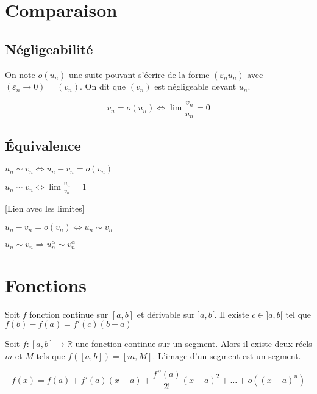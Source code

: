 \documentclass[french]{yLectureNote}
\begin{document}
\section{Comparaison}
\subsection{Négligeabilité}
\begin{definition}
On note $o(u_n)$ une suite pouvant s'écrire de la forme $(\varepsilon_nu_n)$ avec $(\varepsilon_n \to 0) = (v_n)$. On dit que $(v_n)$ est négligeable devant $u_n$.
\end{definition}
\begin{proposition}
\[v_n = o(u_n) \iff \lim \frac{v_n}{u_n} = 0\]
\end{proposition}
\subsection{Équivalence}
\begin{definition}
$u_n\sim v_n \iff u_n-v_n = o(v_n)$
\end{definition}
\begin{proposition}
$u_n\sim v_n \iff \lim \frac{u_n}{v_n} = 1$
\end{proposition}[Lien avec les limites]
\begin{proposition}
$u_n-v_n = o(v_n) \iff u_n\sim v_n$
\end{proposition}
\begin{proposition}
$u_n\sim v_n \Rightarrow u_n^{\alpha} \sim v_n^{\alpha}$
\end{proposition}
\section{Fonctions}
\begin{theorem}
Soit $f$ fonction continue sur $[a,b]$ et dérivable sur $]a,b[$. Il existe $c\in]a,b[$ tel que \(f(b)-f(a) = f'(c)(b-a)\)
\end{theorem}
\begin{theorem}
Soit $f : [a,b] \to \mathbb{R}$ une fonction continue sur un segment. Alors il existe deux réels $m$ et $M$ tels que $f([a,b]) = [m,M]$. L'image d'un segment est un segment.
\end{theorem}
\begin{theorem}
 \[f(x) = f(a) + f'(a)(x-a) + \frac{f''(a)}{2!}(x-a)^2+\dots+o((x-a)^n)\]
\end{theorem}
\end{document}
